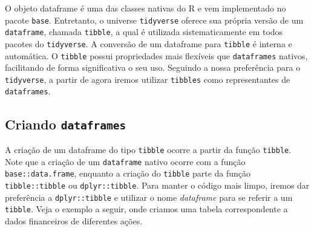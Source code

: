 \documentclass[
  11pt,
]{book}
\begin{document}
O objeto dataframe é uma das classes nativas do R e vem implementado no pacote \texttt{base}. Entretanto, o universe \texttt{tidyverse} oferece sua própria versão de um \texttt{dataframe}, chamada \texttt{tibble}, a qual é utilizada sistematicamente em todos pacotes do \texttt{tidyverse}. A conversão de um dataframe para \texttt{tibble} é interna e automática. O \texttt{tibble} possui propriedades mais flexíveis que \texttt{dataframes} nativos, facilitando de forma significativa o seu uso. Seguindo a nossa preferência para o \texttt{tidyverse}, a partir de agora iremos utilizar \texttt{tibbles} como representantes de \texttt{dataframes}.

\hypertarget{criando-dataframes}{%
\subsection{\texorpdfstring{Criando \texttt{dataframes}}{Criando dataframes}}\label{criando-dataframes}}

A criação de um dataframe do tipo \texttt{tibble} ocorre a partir da função \texttt{tibble}. Note que a criação de um \texttt{dataframe} nativo ocorre com a função \texttt{base::data.frame}, enquanto a criação do \texttt{tibble} parte da função \texttt{tibble::tibble} ou \texttt{dplyr::tibble}. Para manter o código mais limpo, iremos dar preferência a \texttt{dplyr::tibble} e utilizar o nome \emph{dataframe} para se referir a um \texttt{tibble}. Veja o exemplo a seguir, onde criamos uma tabela correspondente a dados financeiros de diferentes ações.    
\end{document}
